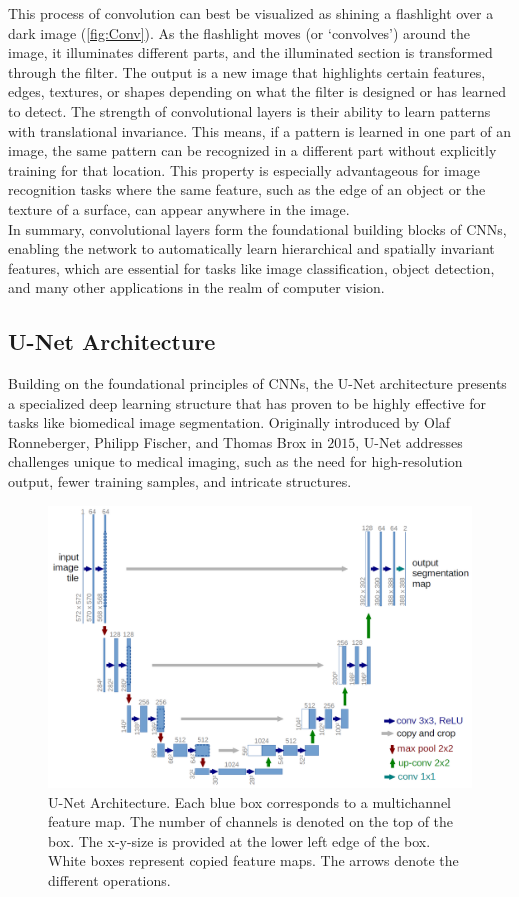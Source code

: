 \noindent This process of convolution can best be visualized as shining a flashlight over a dark image (\autoref{fig:Conv}). As the flashlight moves (or `convolves') around the image,
it illuminates different parts, and the illuminated section is transformed through the filter. The output is a new image that highlights certain features, edges, textures,
or shapes depending on what the filter is designed or has learned to detect.
The strength of convolutional layers is their ability to learn patterns with translational invariance. This means,
if a pattern is learned in one part of an image, the same pattern can be recognized in a different part without explicitly training for that location.
This property is especially advantageous for image recognition tasks where the same feature, such as the edge of an object or the texture of a surface, can appear anywhere in the image.\\[1ex]
In summary, convolutional layers form the foundational building blocks of CNNs, enabling the network to automatically learn hierarchical and spatially invariant features,
which are essential for tasks like image classification, object detection, and many other applications in the realm of computer vision.

\subsection{U-Net Architecture}
Building on the foundational principles of CNNs,
the U-Net architecture presents a specialized deep learning structure that has proven to be highly effective for tasks like biomedical image segmentation.
Originally introduced by Olaf Ronneberger, Philipp Fischer, and Thomas Brox in $2015$\cite{ronneberger_u-net_2015}, U-Net addresses challenges unique to medical imaging, such as the need for high-resolution output,
fewer training samples, and intricate structures.

\begin{figure}[!hb]
	\centering
	\includegraphics[width=0.8\linewidth]{images/UNet-Architecture}
	\caption{U-Net Architecture. Each blue box corresponds to a multichannel feature map.
	The number of channels is denoted on the top of the box.
	The x-y-size is provided at the lower left edge of the box.
	White boxes represent copied feature maps.
	The arrows denote the different operations\cite[2]{ronneberger_u-net_2015}.}
	\label{fig:UNet}
\end{figure}


